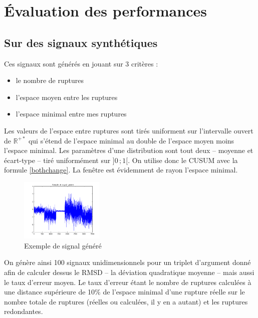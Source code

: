 \documentclass[french,11pt,notitlepage]{report}
\begin{document}
	\chapter{Évaluation des performances}
	
	
	
	\section{Sur des signaux synthétiques}
	
	Ces signaux sont générés en jouant sur 3 critères :
	
	\begin{itemize}
	\item le nombre de ruptures
	\item l'espace moyen entre les ruptures
	\item l'espace minimal entre mes ruptures\\
	\end{itemize}
	
	Les valeurs de l'espace entre ruptures sont tirés uniforment sur l'intervalle ouvert de $\mathbb R^{+*}$ qui s'étend de l'espace minimal au double de l'espace moyen moins l'espace minimal.
	Les paramètres d'une distribution sont tout deux -- moyenne et écart-type -- tiré uniformément sur $]0\,;1[$.
	On utilise donc le CUSUM avec la formule \ref{bothchange}.
	La fenêtre est évidemment de rayon l'espace minimal.
	
	\begin{figure}[h]
		\includegraphics[width=\linewidth,height=3cm]{synthexpl}
		\caption{Exemple de signal généré}
		\label{test_multi_rupt_seg}
	\end{figure}
	
	On génère ainsi 100 signaux unidimensionnels pour un triplet d'argument donné afin de calculer dessus le RMSD -- la déviation quadratique moyenne --
	 mais aussi le taux d'erreur moyen.
	Le taux d'erreur étant le nombre de ruptures calculées à une distance supérieure de 10\% de l'espace minimal d'une rupture réelle sur le nombre totale de ruptures (réelles ou calculées, il y en a autant) et les ruptures redondantes.
	
\end{document}
